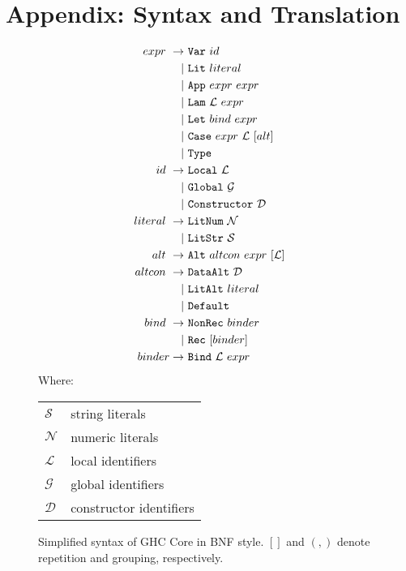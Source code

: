 \iffalse
\section*{Appendix: Syntax and Translation}

\begin{figure}
  \begin{equation}
    \begin{split}
      expr\    \rightarrow\ & \texttt{Var}\ id                          \\
                         |\ & \texttt{Lit}\ literal                     \\
                         |\ & \texttt{App}\ expr\ expr                  \\
                         |\ & \texttt{Lam}\ \mathcal{L}\ expr           \\
                         |\ & \texttt{Let}\ bind\ expr                  \\
                         |\ & \texttt{Case}\ expr\ \mathcal{L}\ [alt]   \\
                         |\ & \texttt{Type}                             \\
      id\      \rightarrow\ & \texttt{Local}\       \mathcal{L}         \\
                         |\ & \texttt{Global}\      \mathcal{G}         \\
                         |\ & \texttt{Constructor}\ \mathcal{D}         \\
      literal\ \rightarrow\ & \texttt{LitNum}\ \mathcal{N}              \\
                         |\ & \texttt{LitStr}\ \mathcal{S}              \\
      alt\     \rightarrow\ & \texttt{Alt}\ altcon\ expr\ [\mathcal{L}] \\
      altcon\  \rightarrow\ & \texttt{DataAlt}\ \mathcal{D}             \\
                         |\ & \texttt{LitAlt}\ literal                  \\
                         |\ & \texttt{Default}                          \\
      bind\    \rightarrow\ & \texttt{NonRec}\ binder                   \\
                         |\ & \texttt{Rec}\ [binder]                    \\
      binder   \rightarrow\ & \texttt{Bind}\ \mathcal{L}\ expr
    \end{split}
  \end{equation}
  Where:
  \begin{tabular}[t]{l @{ $=$ } l}
    $\mathcal{S}$ & string literals    \\
    $\mathcal{N}$ & numeric literals   \\
    $\mathcal{L}$ & local identifiers  \\
    $\mathcal{G}$ & global identifiers \\
    $\mathcal{D}$ & constructor identifiers
  \end{tabular}

  \caption{Simplified syntax of GHC Core in BNF style. $[]$ and $(,)$ denote repetition and grouping, respectively.}
  \label{fig:coresyntax}
\end{figure}

